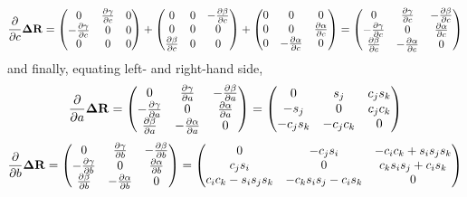 \documentclass{article}
\def\vec#1{\ensuremath{\mathrm{\bf #1}}}
\def\partder#1#2{\ensuremath{\frac{\partial #1}{\partial #2}}}
\begin{document}
\[
\partder{}{c} \vec{\Delta R} = 
\begin{pmatrix}
 0 & \partder{\gamma}{c} & 0 \\
 -\partder{\gamma}{c} & 0 & 0 \\
 0 & 0 & 0  
 \end{pmatrix}
 + 
\begin{pmatrix}
 0 & 0 & -\partder{\beta}{c}\\
 0 & 0 & 0 \\
 \partder{\beta}{c} & 0 & 0  
 \end{pmatrix}
 + 
\begin{pmatrix}
 0 & 0 & 0 \\
 0 & 0 & \partder{\alpha}{c} \\
 0 & -\partder{\alpha}{c} & 0  
 \end{pmatrix}
=
\begin{pmatrix}
 0 & \partder{\gamma}{c} & -\partder{\beta}{c} \\
 -\partder{\gamma}{c} & 0 & \partder{\alpha}{c} \\
 \partder{\beta}{c} & -\partder{\alpha}{c} & 0  
 \end{pmatrix}
\]
and finally, equating left- and right-hand side,
\[
\partder{}{a} \vec{\Delta R} = 
\begin{pmatrix}
 0 & \partder{\gamma}{a} & -\partder{\beta}{a} \\
 -\partder{\gamma}{a} & 0 & \partder{\alpha}{a} \\
 \partder{\beta}{a} & -\partder{\alpha}{a} & 0  
 \end{pmatrix}
 = 
\begin{pmatrix}
0 & s_j & c_j s_k \\ 
-s_j& 0& c_j c_k \\
-c_j s_k & -c_j c_k & 0
\end{pmatrix}
\]
\[
\partder{}{b} \vec{\Delta R} = 
\begin{pmatrix}
 0 & \partder{\gamma}{b} & -\partder{\beta}{b} \\
 -\partder{\gamma}{b} & 0 & \partder{\alpha}{b} \\
 \partder{\beta}{b} & -\partder{\alpha}{b} & 0  
 \end{pmatrix}
=
\begin{pmatrix}
0 & -c_j  s_i & -c_i  c_k  + s_i  s_j  s_k \\
c_j  s_i & 0& c_k  s_i  s_j  + c_i  s_k \\
c_i  c_k  - s_i  s_j  s_k & -c_k  s_i  s_j  - c_i  s_k & 0
\end{pmatrix}
\]
\end{document}
